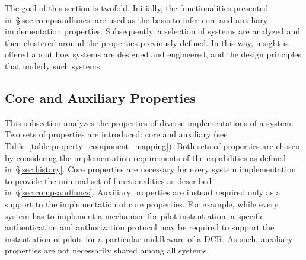 \documentclass{sig-alternate}
\begin{document}

The goal of this section is twofold. Initially, the \pilot functionalities
presented in~\S\ref{sec:compsandfuncs} are used as the basis to infer core and
auxiliary \pilot implementation properties. Subsequently, a selection of \pilot
systems are analyzed and then clustered around the properties previously
defined. In this way, insight is offered about how \pilot systems are designed
and engineered, and the design principles that underly such systems.


 

%
\subsection{Core and Auxiliary Properties}
\label{sec:properties}

This subsection analyzes the properties of diverse implementations of a \pilot
system. Two sets of properties are introduced: core and auxiliary (see
Table~\ref{table:property_component_mapping}). Both sets of properties are
chosen by considering the implementation requirements of the \pilot capabilities
as defined in~\S\ref{sec:history}. Core properties are necessary for every
\pilot system implementation to provide the minimal set of functionalities as
described in~\S\ref{sec:compsandfuncs}. Auxiliary properties are instead
required only as a support to the implementation of core properties. For
example, while every \pilot system has to implement a mechanism for pilot
instantiation, a specific authentication and authorization protocol may be
required to support the instantiation of pilots for a particular middleware of
a DCR. As such, auxiliary properties are not necessarily shared among all \pilot
systems.

\end{document}
